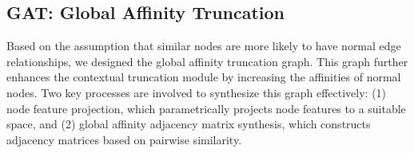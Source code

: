 \documentclass{article}
\begin{document}




    


\subsection{GAT: Global Affinity Truncation }
Based on the assumption that similar nodes are more likely to have normal edge relationships, we designed the global affinity truncation graph.
This graph further enhances the contextual truncation module by increasing the affinities of normal nodes. Two key processes are involved to synthesize this graph effectively: (1) node feature projection, which parametrically projects node features to a suitable space, and (2) global affinity adjacency matrix synthesis, which constructs adjacency matrices based on pairwise similarity.
\end{document}
